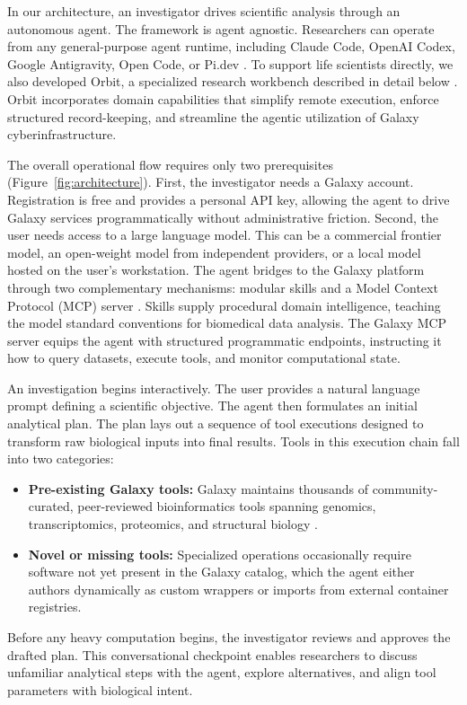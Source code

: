 \documentclass[11pt,letterpaper]{article}
\begin{document}
In our architecture, an investigator drives scientific analysis through an autonomous agent. The framework is agent agnostic. Researchers can operate from any general-purpose agent runtime, including Claude Code, OpenAI Codex, Google Antigravity, Open Code, or Pi.dev \cite{agenticplugins2026}. To support life scientists directly, we also developed Orbit, a specialized research workbench described in detail below \cite{orbit2026}. Orbit incorporates domain capabilities that simplify remote execution, enforce structured record-keeping, and streamline the agentic utilization of Galaxy cyberinfrastructure.

The overall operational flow requires only two prerequisites (Figure~\ref{fig:architecture}). First, the investigator needs a Galaxy account. Registration is free and provides a personal API key, allowing the agent to drive Galaxy services programmatically without administrative friction. Second, the user needs access to a large language model. This can be a commercial frontier model, an open-weight model from independent providers, or a local model hosted on the user's workstation. The agent bridges to the Galaxy platform through two complementary mechanisms: modular skills and a Model Context Protocol (MCP) server \cite{galaxymcp2026, galaxyskills2026}. Skills supply procedural domain intelligence, teaching the model standard conventions for biomedical data analysis. The Galaxy MCP server equips the agent with structured programmatic endpoints, instructing it how to query datasets, execute tools, and monitor computational state.

An investigation begins interactively. The user provides a natural language prompt defining a scientific objective. The agent then formulates an initial analytical plan. The plan lays out a sequence of tool executions designed to transform raw biological inputs into final results. Tools in this execution chain fall into two categories:
\begin{itemize}
    \item \textbf{Pre-existing Galaxy tools:} Galaxy maintains thousands of community-curated, peer-reviewed bioinformatics tools spanning genomics, transcriptomics, proteomics, and structural biology \cite{galaxy2024}.
    \item \textbf{Novel or missing tools:} Specialized operations occasionally require software not yet present in the Galaxy catalog, which the agent either authors dynamically as custom wrappers or imports from external container registries.
\end{itemize}
Before any heavy computation begins, the investigator reviews and approves the drafted plan. This conversational checkpoint enables researchers to discuss unfamiliar analytical steps with the agent, explore alternatives, and align tool parameters with biological intent.
\end{document}
